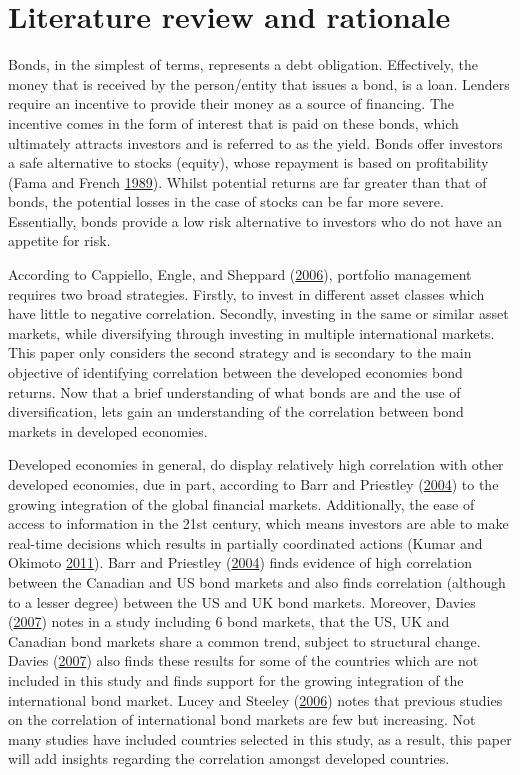 \documentclass[11pt,preprint, authoryear]{elsarticle}
\numberwithin{equation}{section}
\numberwithin{figure}{section}
\numberwithin{table}{section}
\begin{document}
\section{\texorpdfstring{Literature review and rationale
\label{lit_review}}{Literature review and rationale }}\label{literature-review-and-rationale}

Bonds, in the simplest of terms, represents a debt obligation.
Effectively, the money that is received by the person/entity that issues
a bond, is a loan. Lenders require an incentive to provide their money
as a source of financing. The incentive comes in the form of interest
that is paid on these bonds, which ultimately attracts investors and is
referred to as the yield. Bonds offer investors a safe alternative to
stocks (equity), whose repayment is based on profitability (Fama and
French \protect\hyperlink{ref-FRENCH}{1989}). Whilst potential returns
are far greater than that of bonds, the potential losses in the case of
stocks can be far more severe. Essentially, bonds provide a low risk
alternative to investors who do not have an appetite for risk.

According to Cappiello, Engle, and Sheppard
(\protect\hyperlink{ref-cappiello2006}{2006}), portfolio management
requires two broad strategies. Firstly, to invest in different asset
classes which have little to negative correlation. Secondly, investing
in the same or similar asset markets, while diversifying through
investing in multiple international markets. This paper only considers
the second strategy and is secondary to the main objective of
identifying correlation between the developed economies bond returns.
Now that a brief understanding of what bonds are and the use of
diversification, lets gain an understanding of the correlation between
bond markets in developed economies.

Developed economies in general, do display relatively high correlation
with other developed economies, due in part, according to Barr and
Priestley (\protect\hyperlink{ref-barr2004}{2004}) to the growing
integration of the global financial markets. Additionally, the ease of
access to information in the 21st century, which means investors are
able to make real-time decisions which results in partially coordinated
actions (Kumar and Okimoto \protect\hyperlink{ref-kumar2011}{2011}).
Barr and Priestley (\protect\hyperlink{ref-barr2004}{2004}) finds
evidence of high correlation between the Canadian and US bond markets
and also finds correlation (although to a lesser degree) between the US
and UK bond markets. Moreover, Davies
(\protect\hyperlink{ref-davies2007}{2007}) notes in a study including 6
bond markets, that the US, UK and Canadian bond markets share a common
trend, subject to structural change. Davies
(\protect\hyperlink{ref-davies2007}{2007}) also finds these results for
some of the countries which are not included in this study and finds
support for the growing integration of the international bond market.
Lucey and Steeley (\protect\hyperlink{ref-lucey2006}{2006}) notes that
previous studies on the correlation of international bond markets are
few but increasing. Not many studies have included countries selected in
this study, as a result, this paper will add insights regarding the
correlation amongst developed countries.
\end{document}
